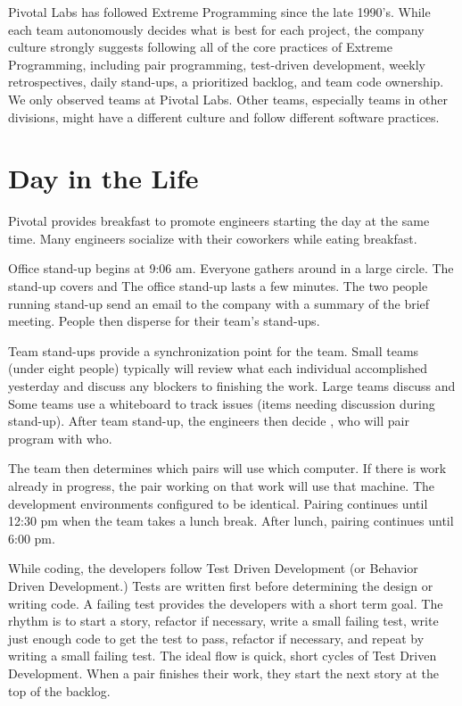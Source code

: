 Pivotal Labs has followed Extreme Programming \cite{BeckExtremeProgramming2004} since the late 1990's. While each team autonomously decides what is best for each project, the company culture strongly suggests following all of the core practices of Extreme Programming, including pair programming, test-driven development, weekly retrospectives, daily stand-ups, a prioritized backlog, and team code ownership. We only observed teams at Pivotal Labs. Other teams, especially teams in other divisions, might have a different culture and follow different software practices.


\section{Day in the Life}
Pivotal provides breakfast to promote engineers starting the day at the same time. Many engineers socialize with their coworkers while eating breakfast. 


Office stand-up begins at 9:06 am. Everyone gathers around in a large circle. The stand-up covers    and  The office stand-up lasts a few minutes. The two people running stand-up send an email to the company with a summary of the brief meeting. People then disperse for their team’s stand-ups.


Team stand-ups provide a synchronization point for the team. Small teams (under eight people) typically will review what each individual accomplished yesterday and discuss any blockers to finishing the work. Large teams discuss  and  Some teams use a whiteboard to track  issues (items needing discussion during stand-up). After team stand-up, the engineers then decide , who will pair program with who. 


The team then determines which pairs will use which computer. If there is work already in progress, the pair working on that work will use that machine. The development environments configured to be identical. Pairing continues until 12:30 pm when the team takes a lunch break. After lunch, pairing continues until 6:00 pm. 


While coding, the developers follow Test Driven Development (or Behavior Driven Development.) Tests are written first before determining the design or writing code. A failing test provides the developers with a short term goal. The rhythm is to start a story, refactor if necessary, write a small failing test, write just enough code to get the test to pass, refactor if necessary, and repeat by writing a small failing test. The ideal flow is quick, short cycles of Test Driven Development. When a pair finishes their work, they start the next story at the top of the backlog. 


